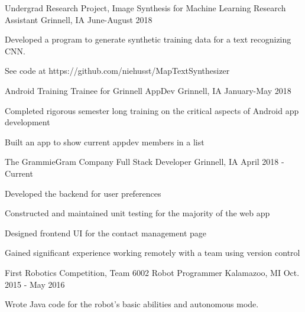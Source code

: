 \begin{cventries}

  \cventry
    {Undergrad Research Project, Image Synthesis for Machine Learning}
    {Research Assistant}
    {Grinnell, IA}
    {June-August 2018}
    {
      \begin{cvitems}
        \item {Developed a program to generate synthetic training data for a text recognizing CNN.}
        \item{See code at https://github.com/niehusst/MapTextSynthesizer}
      \end{cvitems}
    }

  \cventry
    {Android Training}
    {Trainee for Grinnell AppDev}
    {Grinnell, IA}
    {January-May 2018}
    {
	\begin{cvitems}
	  \item {Completed rigorous semester long training on the critical aspects of Android app development}
	  \item {Built an app to show current appdev members in a list}
	\end{cvitems}
    }

  \cventry
    {The GrammieGram Company}
    {Full Stack Developer}
    {Grinnell, IA}
    {April 2018 - Current}
    {
      \begin{cvitems}
        \item {Developed the backend for user preferences}
        \item {Constructed and maintained unit testing for the majority of the web app}
        \item {Designed frontend UI for the contact management page}
        \item {Gained significant experience working remotely with a team using version control}
      \end{cvitems}
    }

  \cventry
    {First Robotics Competition, Team 6002}
    {Robot Programmer}
    {Kalamazoo, MI}
    {Oct. 2015 - May 2016}
    {
      \begin{cvitems}
        \item {Wrote Java code for the robot’s basic abilities and autonomous mode.}
      \end{cvitems}
    }


\end{cventries}
